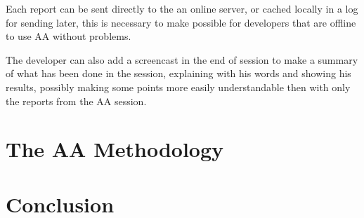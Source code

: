 \documentclass[letterpaper]{article}
\begin{document}
Each report can be sent directly to the an online server, or cached locally in
a log for sending later, this is necessary to make possible for developers that are
offline to use AA without problems.

The developer can also add a screencast in the end of session to make a summary
of what has been done in the session, explaining with his words and showing his
results, possibly making some points more easily understandable then with only
the reports from the AA session.



\section{The AA Methodology}

\section{Conclusion}


%
%


\end{document}
